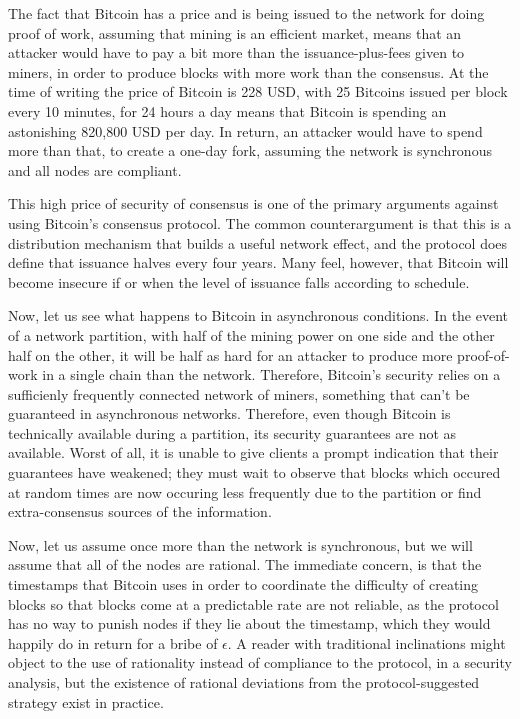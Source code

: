 \documentclass[11pt,a4paper]{article}
\theoremstyle{plain}
\theoremstyle{definition}
\begin{document}
The fact that Bitcoin has a price and is being issued to the network for doing proof of work, assuming that mining is an efficient market, means that an attacker would have to pay a bit more than the issuance-plus-fees given to miners, in order to produce blocks with more work than the consensus. At the time of writing the price of Bitcoin is 228 USD, with 25 Bitcoins issued per block every 10 minutes, for 24 hours a day means that Bitcoin is spending an astonishing 820,800 USD per day. In return, an attacker would have to spend more than that, to create a one-day fork, assuming the network is synchronous and all nodes are compliant.

This high price of security of consensus is one of the primary arguments against using Bitcoin's consensus protocol. The common counterargument is that this is a distribution mechanism that builds a useful network effect, and the protocol does define that issuance halves every four years. Many feel, however, that Bitcoin will become insecure if or when the level of issuance falls according to schedule.

Now, let us see what happens to Bitcoin in asynchronous conditions. In the event of a network partition, with half of the mining power on one side and the other half on the other, it will be half as hard for an attacker to produce more proof-of-work in a single chain than the network. Therefore, Bitcoin's security relies on a sufficienly frequently connected network of miners, something that can't be guaranteed in asynchronous networks. Therefore, even though Bitcoin is technically available during a partition, its security guarantees are not as available. Worst of all, it is unable to give clients a prompt indication that their guarantees have weakened; they must wait to observe that blocks which occured at random times are now occuring less frequently due to the partition or find extra-consensus sources of the information.

Now, let us assume once more than the network is synchronous, but we will assume that all of the nodes are rational. The immediate concern, is that the timestamps that Bitcoin uses in order to coordinate the difficulty of creating blocks so that blocks come at a predictable rate are not reliable, as the protocol has no way to punish nodes if they lie about the timestamp, which they would happily do in return for a bribe of $\epsilon$. A reader with traditional inclinations might object to the use of rationality instead of compliance to the protocol, in a security analysis, but the existence of rational deviations from the protocol-suggested strategy exist in practice.
\end{document}
